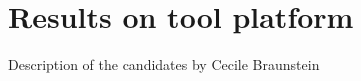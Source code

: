
\chapter{Results on tool platform}

\begin{todo_comment}
Description of the candidates by Cecile Braunstein
\end{todo_comment}